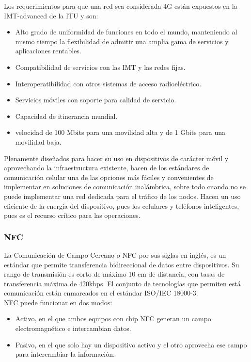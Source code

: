 Los requerimientos para que una red sea considerada 4G  están expuestos en la IMT-advanced de la ITU y son:
\begin{itemize}
\item Alto grado de uniformidad de funciones en todo el mundo, manteniendo al mismo tiempo la flexibilidad de admitir una amplia gama de servicios y aplicaciones rentables.
\item Compatibilidad de servicios con las IMT y las redes fijas.
\item Interoperatibilidad con otros sistemas de acceso radioeléctrico.
\item Servicios móviles con soporte para calidad de servicio.
\item Capacidad de itinerancia mundial.
\item velocidad de 100 Mbits para una movilidad alta y de 1 Gbits para una movilidad baja.
\end{itemize}

Plenamente diseñados para hacer su uso en dispositivos de carácter móvil y aprovechando la infraestructura existente, hacen de los estándares de comunicación celular una de las opciones más fáciles y convenientes de implementar en soluciones de comunicación inalámbrica, sobre todo cuando no se puede implementar una red dedicada para el tráfico de los nodos. Hacen un uso eficiente de la energía del dispositivo, pues los celulares y teléfonos inteligentes, pues es el recurso crítico para las operaciones.

\subsubsection{NFC}
La Comunicación de Campo Cercano o NFC  por sus siglas en inglés, es un estándar que permite transferencia bidireccional de datos entre dispositivos. Su rango de transmisión es corto de máximo 10 cm de distancia, con tasas de transferencia máxima de 420kbps. El conjunto de tecnologías que permiten está comunicación están enmarcados en el estándar ISO/IEC 18000-3.\cite{isonfc}\\

NFC puede funcionar en dos modos:
\begin{itemize}
\item Activo, en el que ambos equipos con chip NFC generan un campo electromagnético e intercambian datos.
\item Pasivo, en el que solo hay un dispositivo activo y el otro aprovecha ese campo para intercambiar la información.
\end{itemize}

